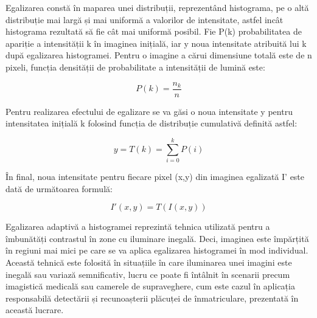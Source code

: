 \documentclass[12pt]{article}
\begin{document}
Egalizarea const\u{a} \^{i}n maparea unei distribuții, reprezent\^{a}nd histograma, pe o alt\u{a} distribuție mai larg\u{a} și mai uniform\u{a} a valorilor de intensitate, astfel inc\^{a}t histograma rezultat\u{a} s\u{a} fie c\^{a}t mai uniform\u{a} posibil. Fie P(k) probabilitatea de apariție a intensit\u{a}ții k \^{i}n imaginea inițial\u{a}, iar y noua intensitate atribuit\u{a} lui k dup\u{a} egalizarea histogramei. Pentru o imagine a c\u{a}rui dimensiune total\u{a} este de n pixeli, funcția densit\u{a}ții de probabilitate a intensit\u{a}ții de lumin\u{a} este:

\begin{equation}
    P(k) = \frac{n_k}{n}
\end{equation}

Pentru realizarea efectului de egalizare se va g\u{a}si o noua intensitate y pentru intensitatea inițial\u{a} k folosind funcția de distribuție cumulativ\u{a} definit\u{a} astfel:

\begin{equation}
y = T(k) = \sum_{i=0}^{k} P(i)
\end{equation}

\^{I}n final, noua intensitate pentru fiecare pixel (x,y) din imaginea egalizat\u{a} I' este dat\u{a} de urm\u{a}toarea formul\u{a}:

\begin{equation}
I'(x,y) = T(I(x,y))
\end{equation}

Egalizarea adaptiv\u{a} a histogramei reprezint\u{a} tehnica utilizat\u{a} pentru a \^{i}mbun\u{a}t\u{a}ți contrastul \^{i}n zone cu iluminare inegal\u{a}. Deci, imaginea este \^{i}mp\u{a}rțit\u{a} \^{i}n regiuni mai mici pe care se va aplica egalizarea histogramei \^{i}n mod individual. Aceast\u{a} tehnic\u{a} este folosit\u{a} \^{i}n situațiile \^{i}n care iluminarea unei imagini este inegal\u{a} sau variaz\u{a} semnificativ, lucru ce poate fi \^{i}nt\^{a}lnit \^{i}n scenarii precum imagistic\u{a} medical\u{a} sau camerele de supraveghere, cum este cazul \^{i}n aplicația responsabil\u{a} detect\u{a}rii și recunoașterii pl\u{a}cuței de \^{i}nmatriculare, prezentat\u{a} \^{i}n aceast\u{a} lucrare. 
\end{document}
